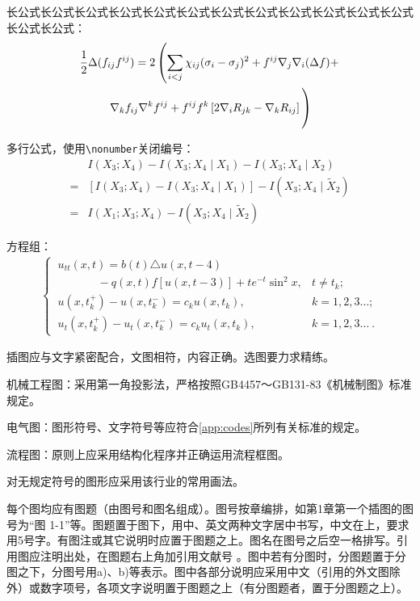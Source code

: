 长公式长公式长公式长公式长公式长公式长公式长公式长公式长公式长公式长公式长公式长公式：
\begin{multline}\label{eq:long}
\frac{1}{2}\Delta(f_{ij}f^{ij})=
2\left(\sum_{i<j}\chi_{ij}(\sigma_i-\sigma_j)^2+f^{ij}\nabla_j\nabla_i(\Delta f)+\right .\\
\left .\nabla_kf_{ij}\nabla^kf^{ij}+f^{ij}f^k\left[2\nabla_iR_{jk}-\nabla_kR_{ij}\right]\vphantom{\sum_{i<j}}\right)
\end{multline}

多行公式，使用\verb|\nonumber|关闭编号：
\begin{align}
&I(X_3;X_4)-I(X_3;X_4\mid{}X_1)-I(X_3;X_4\mid{}X_2)\nonumber\\
=&[I(X_3;X_4)-I(X_3;X_4\mid{}X_1)]-I(X_3;X_4\mid{}\tilde{X}_2)\\
=&I(X_1;X_3;X_4)-I(X_3;X_4\mid{}\tilde{X}_2)
\end{align}

方程组：
\begin{align}
\begin{cases}
\ u_{tt}(x,t)= b(t)\triangle u(x,t-4)&\\
\ \hspace{42pt}- q(x,t)f[u(x,t-3)]+te^{-t}\sin^2 x,  &  t \neq t_k; \\
\ u(x,t_k^+) - u(x,t_k^-) = c_k u(x,t_k), & k=1,2,3\ldots ;\\
\ u_{t}(x,t_k^+) - u_{t}(x,t_k^-) =c_k u_{t}(x,t_k), &
k=1,2,3\ldots\ .
\end{cases}
\end{align}

插图应与文字紧密配合，文图相符，内容正确。选图要力求精练。

机械工程图：采用第一角投影法，严格按照GB4457～GB131-83《机械制图》标准规定。

电气图：图形符号、文字符号等应符合\cref{app:codes}所列有关标准的规定。

流程图：原则上应采用结构化程序并正确运用流程框图。

对无规定符号的图形应采用该行业的常用画法。

每个图均应有图题（由图号和图名组成）。图号按章编排，如第1章第一个插图的图号为“图 1-1”等。图题置于图下，用中、英文两种文字居中书写，中文在上，要求用5号字。有图注或其它说明时应置于图题之上。图名在图号之后空一格排写。引用图应注明出处，在图题右上角加引用文献号 。图中若有分图时，分图题置于分图之下，分图号用a)、b)等表示。图中各部分说明应采用中文（引用的外文图除外）或数字项号，各项文字说明置于图题之上（有分图题者，置于分图题之上）。

